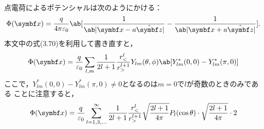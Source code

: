   \hrulefill\\
  点電荷によるポテンシャルは次のようにかける：
  \begin{gather}%
    \Phi(\bs{x}) = \frac{q}{4\pi \eps_0}
    \ab[\frac{1}{\ab|\bs{x} - a\hat{\bs{z}}|}
    - \frac{1}{\ab|\bs{x} + a \hat{\bs{z}}|}].
  \end{gather}%
  本文中の式(3.70)を利用して書き直すと，
  \begin{gather}%
    \Phi(\bs{x}) = \frac{q}{\eps_0} \sum_{l,m} \frac{1}{2l+1} \frac{r_<^l}{r_>^{l+1}}
    Y_{lm}(\theta,\phi) \ab[Y^*_{lm}(0,0) - Y^*_{lm}(\pi,0)]
  \end{gather}%
ここで，$Y^*_{lm}(0,0)-Y^*_{lm}(\pi,0) \neq 0$となるのは$m = 0$で$l$が奇数のときのみである
ことに注意すると，
\begin{gather}%
  \Phi(\bs{x}) = \frac{q}{\eps_0} \sum_{l=1,3,\ldots}^{\infty} \frac{1}{2l+1} \frac{r_<^l}{r_>^{l+1}} \sqrt{\frac{2l+1}{4\pi}}P_l(\cos\theta) 
  \cdot \sqrt{\frac{2l+1}{4\pi}}\cdot2
\end{gather}%






